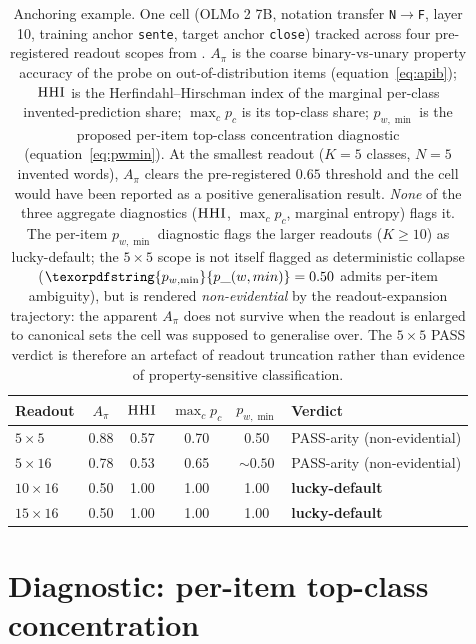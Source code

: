 \documentclass[11pt,letterpaper]{article}
\newcommand{\pwmin}{\texorpdfstring{\ensuremath{p_{w,\min}}}{p\_(w,min)}}
\newcommand{\hhi}{\textsc{HHI}}
\newcommand{\NtoF}{N$\to$F}
\begin{document}
\begin{table}[h]
  \centering
  \small
  \begin{tabular}{lccccl}
    \toprule
    Readout & $A_\pi$ & $\hhi$ & $\max_c p_c$ & \pwmin{} & Verdict\\
    \midrule
    $5 \times 5$ & 0.88 & 0.57 & 0.70 & 0.50 & PASS-arity (non-evidential)\\
    $5 \times 16$ & 0.78 & 0.53 & 0.65 & ${\sim}0.50$ & PASS-arity (non-evidential)\\
    $10 \times 16$ & 0.50 & 1.00 & 1.00 & 1.00 & \textbf{lucky-default}\\
    $15 \times 16$ & 0.50 & 1.00 & 1.00 & 1.00 & \textbf{lucky-default}\\
    \bottomrule
  \end{tabular}
  \caption{Anchoring example.
  One cell (OLMo 2 7B, notation transfer \texttt{\NtoF{}},
  layer 10, training anchor \texttt{sente}, target anchor
  \texttt{close}) tracked across four pre-registered readout scopes
  from \citet{budworth2026substrate}.
  $A_\pi$ is the coarse binary-vs-unary property accuracy of the
  probe on out-of-distribution items
  (equation~\ref{eq:apib}); $\hhi$ is the Herfindahl--Hirschman
  index of the marginal per-class invented-prediction share;
  $\max_c p_c$ is its top-class share; \pwmin{} is the proposed
  per-item top-class concentration diagnostic
  (equation~\ref{eq:pwmin}). At the smallest readout
  ($K = 5$ classes, $N = 5$ invented words), $A_\pi$ clears the
  pre-registered $0.65$ threshold and the cell would have been
  reported as a positive generalisation result. \emph{None} of the
  three aggregate diagnostics ($\hhi$, $\max_c p_c$, marginal
  entropy) flags it. The per-item \pwmin{} diagnostic flags the
  larger readouts ($K \geq 10$) as lucky-default; the $5 \times 5$
  scope is not itself flagged as deterministic collapse
  ($\pwmin = 0.50$ admits per-item ambiguity), but is rendered
  \emph{non-evidential} by the readout-expansion trajectory: the
  apparent $A_\pi$ does not survive when the readout is enlarged
  to canonical sets the cell was supposed to generalise over. The
  $5 \times 5$ PASS verdict is therefore an artefact of readout
  truncation rather than evidence of property-sensitive
  classification.}
  \label{tab:anchor}
\end{table}

\section{Diagnostic: per-item top-class concentration}
\label{sec:diagnostic}
\end{document}

